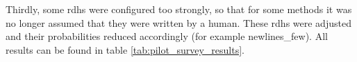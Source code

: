 \documentclass[%
class=scrreprt,
chapterprefix=false,%
open=right,%
twoside=false,%
paper=a4,%
logofile={Logo\_zentral\_farbig\_EN.png},%
thesistype=master,%
UKenglish,%
]{se2thesis}
\theoremstyle{definition}
\begin{document}
	Thirdly, some rdhs were configured too strongly, so that for some methods it was no longer assumed that they were written by a human. These rdhs were adjusted and their probabilities reduced accordingly (for example newlines\_few). All results can be found in table \ref{tab:pilot_survey_results}.

\end{document}
